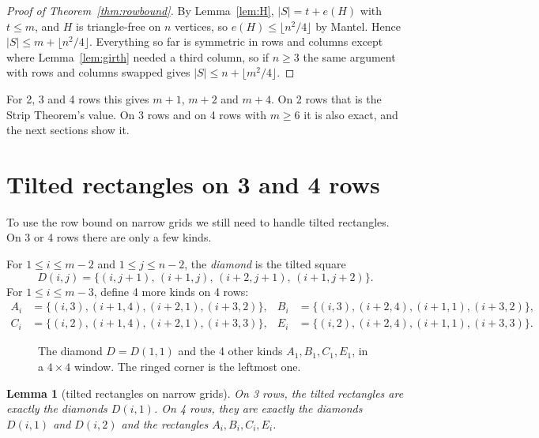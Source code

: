 \documentclass[11pt]{article}
\newtheorem{lemma}[theorem]{Lemma}
\theoremstyle{definition}
\theoremstyle{remark}
\begin{document}
\begin{proof}[Proof of Theorem~\ref{thm:rowbound}]
By Lemma~\ref{lem:H}, $|S|=t+e(H)$ with $t\le m$, and $H$ is triangle-free on $n$ vertices, so
$e(H)\le\lfloor n^2/4\rfloor$ by Mantel. Hence $|S|\le m+\lfloor n^2/4\rfloor$. Everything so far
is symmetric in rows and columns except where Lemma~\ref{lem:girth} needed a third column, so if
$n\ge3$ the same argument with rows and columns swapped gives $|S|\le n+\lfloor m^2/4\rfloor$.
\end{proof}

For 2, 3 and 4 rows this gives $m+1$, $m+2$ and $m+4$. On 2 rows that is the Strip Theorem's
value. On 3 rows and on 4 rows with $m\ge6$ it is also exact, and the next sections show it.

\section{Tilted rectangles on 3 and 4 rows}\label{sec:tilted}

To use the row bound on narrow grids we still need to handle tilted rectangles. On 3 or 4 rows
there are only a few kinds.

For $1\le i\le m-2$ and $1\le j\le n-2$, the \emph{diamond} is the tilted square
\[
D(i,j)=\{(i,j+1),\,(i+1,j),\,(i+2,j+1),\,(i+1,j+2)\}.
\]
For $1\le i\le m-3$, define 4 more kinds on 4 rows:
\begin{align*}
A_i&=\{(i,3),(i+1,4),(i+2,1),(i+3,2)\}, & B_i&=\{(i,3),(i+2,4),(i+1,1),(i+3,2)\},\\
C_i&=\{(i,2),(i+1,4),(i+2,1),(i+3,3)\}, & E_i&=\{(i,2),(i+2,4),(i+1,1),(i+3,3)\}.
\end{align*}

\begin{figure}[htbp]
\centering

\caption{The diamond $D=D(1,1)$ and the 4 other kinds $A_1,B_1,C_1,E_1$, in a $4\times4$
window. The ringed corner is the leftmost one.}
\label{fig:tilted}
\end{figure}

\begin{lemma}[tilted rectangles on narrow grids]\label{lem:tilted}
On 3 rows, the tilted rectangles are exactly the diamonds $D(i,1)$. On 4 rows, they are exactly
the diamonds $D(i,1)$ and $D(i,2)$ and the rectangles $A_i,B_i,C_i,E_i$.
\end{lemma}
\end{document}
